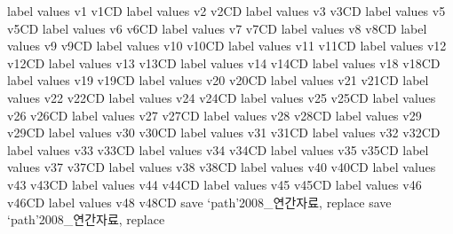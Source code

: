        label values v1 v1CD
        label values v2 v2CD
        label values v3 v3CD
        label values v5 v5CD
        label values v6 v6CD
        label values v7 v7CD
        label values v8 v8CD
        label values v9 v9CD
        label values v10 v10CD
        label values v11 v11CD
        label values v12 v12CD
        label values v13 v13CD
        label values v14 v14CD
        label values v18 v18CD
        label values v19 v19CD
        label values v20 v20CD
        label values v21 v21CD
        label values v22 v22CD
        label values v24 v24CD
        label values v25 v25CD
        label values v26 v26CD
        label values v27 v27CD
        label values v28 v28CD
        label values v29 v29CD
        label values v30 v30CD
        label values v31 v31CD
        label values v32 v32CD
        label values v33 v33CD
        label values v34 v34CD
        label values v35 v35CD
        label values v37 v37CD
        label values v38 v38CD
        label values v40 v40CD
        label values v43 v43CD
        label values v44 v44CD
        label values v45 v45CD
        label values v46 v46CD
        label values v48 v48CD
save `path'2008_연간자료, replace
save `path'2008_연간자료, replace
